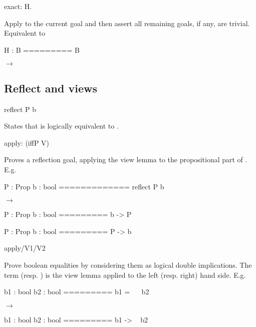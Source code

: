 \begin{landscape}
\begin{small}
\begin{multicols*}{3}[\begin{center}\section*{}\end{center}]
\begin{cheat}
exact: H.
\end{cheat}
  Apply  to the current goal and then assert all
  remaining goals, if any, are trivial. Equivalent to

\begin{cheatout}
 H : B
=========
 B
\end{cheatout}
$\to$
\begin{cheatout}
\end{cheatout}



\subsection*{Reflect and views}

\begin{cheat}
reflect P b
\end{cheat}
States that  is logically equivalent to .

\columnbreak

\begin{cheat}
apply: (iffP V)
\end{cheat}

Proves a reflection goal, applying the view
  lemma  to the propositional part of .
  E.g. 


\begin{cheatout}
 P : Prop
 b : bool
=============
 reflect P b
\end{cheatout}
$\to$
\begin{cheatout}
 P : Prop
 b : bool
=========
 b -> P
\end{cheatout}

\noindent\hspace{0.24\textwidth}
\begin{cheatout}
 P : Prop
 b : bool
=========
 P -> b
\end{cheatout}


\begin{cheat}
apply/V1/V2
\end{cheat}
Prove boolean equalities by considering them as
  logical double implications. The term  (resp. ) is the
  view lemma applied to the left (resp. right) hand
  side. E.g. 


\begin{cheatout}
 b1 : bool
 b2 : bool
=========
 b1 = ~~ b2
\end{cheatout}
$\to$
\begin{cheatout}
 b1 : bool
 b2 : bool
=========
 b1 -> ~ b2
\end{cheatout}


\end{multicols*}
\end{small}
\end{landscape}
